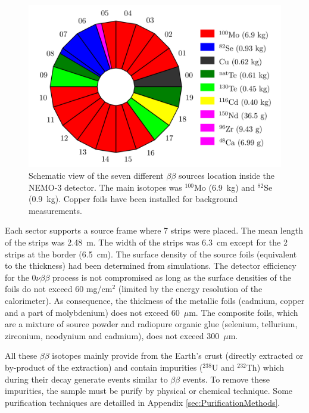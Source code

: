 \documentclass[main.tex]{subfiles}
\begin{document}
\begin{figure}[h!]
\begin{center}
\includegraphics[scale=0.50]{pictures/Chap3/BBSourceDistribution.png}
\caption{Schematic view of the seven different $\beta\beta$ sources location inside the NEMO-3 detector. The main isotopes was $^{\text{100}}$Mo (6.9~kg) and $^{\text{82}}$Se (0.9~kg). Copper foils have been installed for background measurements.}
\label{NEMO3Sector}
\end{center}
\end{figure}


\FloatBarrier


\NI Each sector supports a source frame where 7 strips were placed. The mean length of the strips was 2.48~m. The width of the strips was 6.3~cm except for the 2 strips at the border (6.5~cm). The surface density of the source foils (equivalent to the thickness) had been determined from simulations. The detector efficiency for the 0$\nu\beta\beta$ process is not compromised
as long as the surface densities of the foils do not exceed 60 mg/cm$^\text{2}$ (limited by the energy resolution of the calorimeter). As consequence, the thickness of the metallic foils (cadmium, copper and a part of molybdenium) does not exceed 60~$\mu$m. The composite foils, which are a mixture of source powder and radiopure organic glue (selenium, tellurium, zirconium, neodynium and cadmium), does not exceed 300~$\mu$m. 


\bigskip


\NI All these $\beta\beta$ isotopes mainly provide from the Earth's crust (directly extracted or by-product of the extraction) and contain impurities ($^{\text{238}}$U and $^{\text{232}}$Th) which during their decay generate events similar to $\beta\beta$ events. To remove these impurities, the sample must be purify by physical or chemical technique. Some purification techniques are detailled in Appendix \ref{sec:PurificationMethods}.
\end{document}
